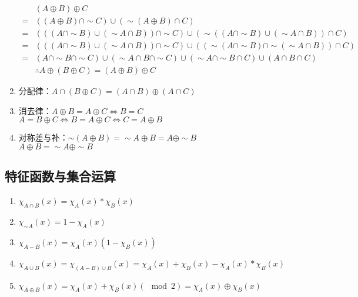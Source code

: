 \documentclass{book}
\newcommand{\Eqv}{\Leftrightarrow}
\begin{document}
\begin{enumerate}
        \begin{align*}
           &(A\oplus B)\oplus C\\
           =&((A\oplus B)\cap\sim C)\cup (\sim (A\oplus B)\cap C)\\
           =&(((A\cap\sim B)\cup (\sim A\cap B))\cap\sim C)\cup (\sim ((A\cap\sim B)\cup (\sim A\cap B))\cap C)\\
           =&(((A\cap\sim B)\cup (\sim A\cap B))\cap\sim C)\cup ((\sim (A\cap\sim B)\cap\sim (\sim A\cap B))\cap C)\\
           =&(A\cap\sim B\cap\sim C)\cup (\sim A\cap B\cap\sim C)\cup (\sim A\cap\sim B\cap C)\cup (A\cap B\cap C)\\
           &\therefore A\oplus\left( B\oplus C \right)=\left( A\oplus B \right)\oplus C
        \end{align*}

    \item 分配律：$A\cap (B\oplus C)=(A\cap B)\oplus (A\cap C)$
    \item 消去律：$A\oplus B=A\oplus C\Eqv B=C$\\
        $A=B\oplus C\Eqv B=A\oplus C\Eqv C=A\oplus B$
    \item 对称差与补：$\sim\left( A\oplus B \right)=\sim A\oplus B=A\oplus\sim B$\\
        $A\oplus B=\sim A\oplus\sim B$
\end{enumerate}
\subsection{特征函数与集合运算}
\begin{enumerate}
    \item $\chi_{A\cap B}(x)=\chi_A(x)*\chi_B(x)$
    \item $\chi_{\sim A}(x)=1-\chi_A(x)$
    \item $\chi_{A-B}(x)=\chi_A(x)\left( 1-\chi_B(x) \right)$
    \item $\chi_{A\cup B}(x)=\chi_{(A-B)\cup B}(x)=\chi_A(x)+\chi_B(x)-\chi_A(x)*\chi_B(x)$
    \item $\chi_{A\oplus B}(x)=\chi_A(x)+\chi_B(x)(\mod 2)=\chi_A(x)\oplus\chi_B(x)$
\end{enumerate}
\end{document}
